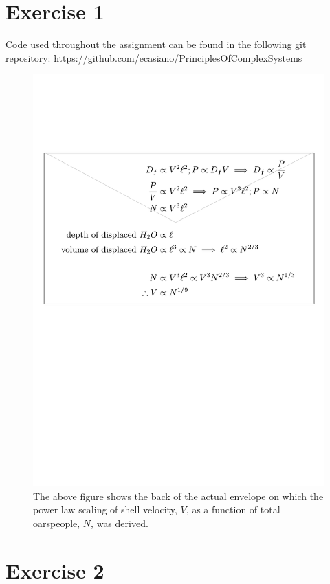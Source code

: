 \documentclass{article}
\begin{document}
\section{Exercise 1}

Code used throughout the assignment can be found in the following git repository: \url{https://github.com/ecasiano/PrinciplesOfComplexSystems}


\begin{figure}[h!]
  \includegraphics[width=\linewidth]{Q01/powerLawEnvelope.pdf}
  \caption{The above figure shows the back of the actual envelope on which the power law scaling of shell velocity, $V$, as a function of total oarspeople, $N$, was derived.}
  \label{fig:envelope}
\end{figure}

\section{Exercise 2}
\end{document}
